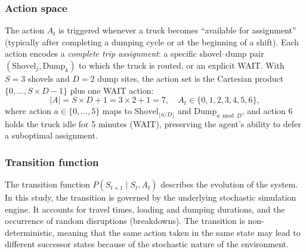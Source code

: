 \documentclass[11pt,a4paper]{article}
\begin{document}
\subsubsection{Action space}

The action $A_t$ is triggered whenever a truck becomes ``available for assignment'' (typically after completing a dumping cycle or at the beginning of a shift). Each action encodes a \emph{complete trip assignment}: a specific shovel--dump pair $(\text{Shovel}_j, \text{Dump}_k)$ to which the truck is routed, or an explicit WAIT. With $S=3$ shovels and $D=2$ dump sites, the action set is the Cartesian product $\{0,\dots,S{\times}D{-}1\}$ plus one WAIT action:
\begin{equation}
  |A| = S \times D + 1 = 3 \times 2 + 1 = 7,
  \quad A_t \in \{0, 1, 2, 3, 4, 5, 6\},
\end{equation}
where action $a \in \{0,\dots,5\}$ maps to $\text{Shovel}_{\lfloor a/D \rfloor}$ and $\text{Dump}_{a \bmod D}$, and action $6$ holds the truck idle for 5 minutes (WAIT), preserving the agent's ability to defer a suboptimal assignment.

\subsubsection{Transition function}

The transition function $P(S_{t+1} \mid S_t, A_t)$ describes the evolution of the system. In this study, the transition is governed by the underlying stochastic simulation engine. It accounts for travel times, loading and dumping durations, and the occurrence of random disruptions (breakdowns). The transition is non-deterministic, meaning that the same action taken in the same state may lead to different successor states because of the stochastic nature of the environment.
\end{document}
